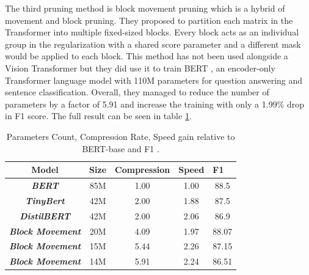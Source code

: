 The third pruning method is block movement pruning \cite{pruning-block} which is a hybrid of movement and block pruning. They proposed to partition each matrix in the Transformer into multiple fixed-sized blocks. Every block acts as an individual group in the regularization with a shared score parameter and a different mask would be applied to each block. This method has not been used alongside a Vision Transformer but they did use it to train BERT \cite{bert}, an encoder-only Transformer language model with 110M parameters for question answering and sentence classification. Overall, they managed to reduce the number of parameters by a factor of 5.91 and increase the training with only a 1.99\% drop in F1 score. The full result can be seen in table \ref{tab:block-movement}.

\begin{table}[!h]
\centering
\begin{tabular}{|c|c|c|c|c|}
\hline
\textbf{Model}                   & \textbf{Size}               & \textbf{Compression}         & \multicolumn{1}{l|}{\textbf{Speed}} & \multicolumn{1}{l|}{\textbf{F1}} \\ \hline
\textit{\textbf{BERT}}           & \cellcolor[HTML]{FFFFFF}85M & \cellcolor[HTML]{FFFFFF}1.00 & \cellcolor[HTML]{FFFFFF}1.00        & \cellcolor[HTML]{FFFFFF}88.5     \\ \hline
\textit{\textbf{TinyBert}}       & \cellcolor[HTML]{FFFFFF}42M & \cellcolor[HTML]{FFFFFF}2.00 & \cellcolor[HTML]{FFFFFF}1.88        & \cellcolor[HTML]{FFFFFF}87.5     \\ \hline
\textit{\textbf{DistilBERT}}     & \cellcolor[HTML]{FFFFFF}42M & \cellcolor[HTML]{FFFFFF}2.00 & \cellcolor[HTML]{FFFFFF}2.06        & \cellcolor[HTML]{FFFFFF}86.9     \\ \hline
\textit{\textbf{Block Movement}} & \cellcolor[HTML]{FFFFFF}20M & \cellcolor[HTML]{FFFFFF}4.09 & \cellcolor[HTML]{FFFFFF}1.97        & \cellcolor[HTML]{FFFFFF}88.07    \\ \hline
\textit{\textbf{Block Movement}} & \cellcolor[HTML]{FFFFFF}15M & \cellcolor[HTML]{FFFFFF}5.44 & \cellcolor[HTML]{FFFFFF}2.26        & \cellcolor[HTML]{FFFFFF}87.15    \\ \hline
\textit{\textbf{Block Movement}} & \cellcolor[HTML]{FFFFFF}14M & \cellcolor[HTML]{FFFFFF}5.91 & \cellcolor[HTML]{FFFFFF}2.24        & \cellcolor[HTML]{FFFFFF}86.51    \\ \hline
\end{tabular}
\caption{Parameters Count, Compression Rate, Speed gain relative to BERT-base and F1 .}
\label{tab:block-movement}
\end{table}
